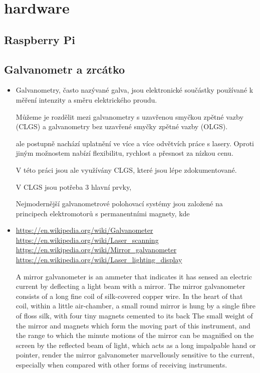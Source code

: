 \chapter{hardware}

\section{Raspberry Pi}

\section{Galvanometr a zrcátko}
\begin{itemize}
  \item
        Galvanometry, často nazývané galva, jsou elektronické součástky používané k měření intenzity a směru elektrického proudu.~\cite{galvo}

        Můžeme je rozdělit mezi galvanometry s uzavřenou smyčkou zpětné vazby (CLGS) a galvanometry bez uzavřené smyčky zpětné vazby (OLGS).~\cite{how-ls-work}

        \cite{advanced-galvo}
        ale postupně nachází uplatnění ve více a více odvětvích práce s lasery.
        Oproti jiným možnostem nabízí flexibilitu, rychlost a přesnost za nízkou cenu.


        V této práci jsou ale využívány CLGS, které jsou lépe zdokumentované.

        V CLGS jsou potřeba 3 hlavní prvky, %

        Nejmodernější galvanometrové polohovací systémy jsou založené na principech elektromotorů s permanentními magnety, kde
        \cite{advanced-galvo}
  \item
        \url{https://en.wikipedia.org/wiki/Galvanometer}\\
        \url{https://en.wikipedia.org/wiki/Laser_scanning}\\
        \url{https://en.wikipedia.org/wiki/Mirror_galvanometer}\\
        \url{https://en.wikipedia.org/wiki/Laser_lighting_display}

        A mirror galvanometer is an ammeter that indicates it has sensed an electric current by deflecting a light beam with a mirror.
        The mirror galvanometer consists of a long fine coil of silk-covered copper wire. %
        In the heart of that coil, within a little air-chamber, a small round mirror is hung by a single fibre of floss silk, with four tiny magnets cemented to its back
        The small weight of the mirror and magnets which form the moving part of this instrument, and the range to which the minute motions of the mirror can be magnified on the screen by the reflected beam of light, which acts as a long impalpable hand or pointer, render the mirror galvanometer marvellously sensitive to the current, especially when compared with other forms of receiving instruments.


\end{itemize}
